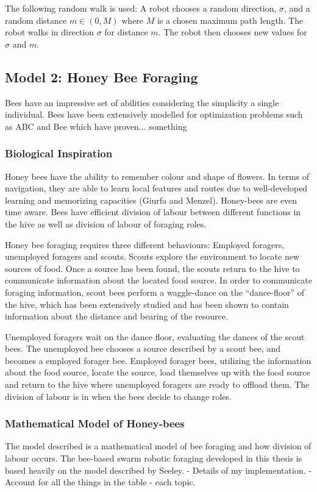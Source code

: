 The following random walk is used: A robot chooses a random direction, $\sigma$, and a random distance $m\in(0,M)$ where $M$ is a chosen maximum path length. The robot walks in direction $\sigma$ for distance $m$. The robot then chooses new values for $\sigma$ and $m$. 


\subsection{Model 2: Honey Bee Foraging}

Bees have an impressive set of abilities considering the simplicity a single individual. Bees have been extensively modelled for optimization problems such as ABC and Bee which have proven... something

\subsubsection{Biological Inspiration}

Honey bees have the ability to remember colour and shape of flowers. In terms of navigation, they are able to learn local features and routes due to well-developed learning and memorizing capacities (Giurfa and Menzel). Honey-bees are even time aware. Bees have efficient division of labour between different functions in the hive as well as division of labour of foraging roles. 

Honey bee foraging requires three different behaviours: Employed foragers, unemployed foragers and scouts. Scouts explore the environment to locate new sources of food. Once a source has been found, the scouts return to the hive to communicate information about the located food source. In order to communicate foraging information, scout bees perform a waggle-dance on the ``dance-floor'' of the hive, which has been extensively studied and has been shown to contain information about the distance and bearing of the resource. 

Unemployed foragers wait on the dance floor, evaluating the dances of the scout bees. The unemployed bee chooses a source described by a scout bee, and becomes a employed forager bee. Employed forager bees, utilizing the information about the food source, locate the source, load themselves up with the food source and return to the hive where unemployed foragers are ready to offload them. The division of labour is in when the bees decide to change roles.

\subsubsection{ Mathematical Model of Honey-bees}
The model described is a mathematical model of bee foraging and how division of labour occurs. The bee-based swarm robotic foraging developed in this thesis is based heavily on the model described by Seeley.
- Details of my implementation. 
- Account for all the things in the table - each topic.



